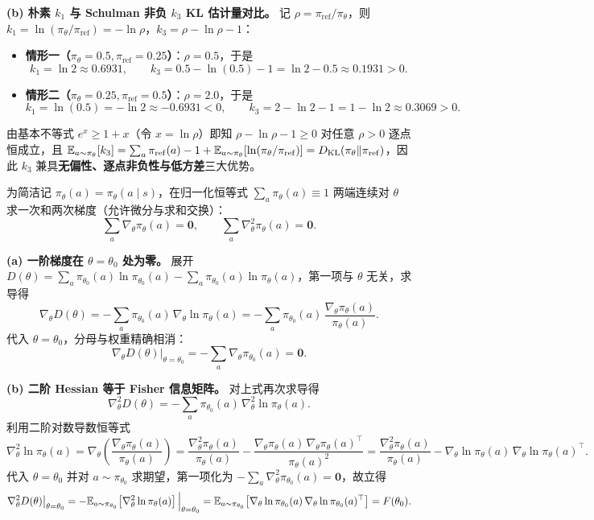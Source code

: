 \textbf{(b) 朴素 $k_1$ 与 Schulman 非负 $k_3$ KL 估计量对比。} 记 $\rho = \pi_{\mathrm{ref}} / \pi_\theta$，则 $k_1 = \ln(\pi_\theta / \pi_{\mathrm{ref}}) = -\ln \rho$，$k_3 = \rho - \ln \rho - 1$：
\begin{itemize}
  \item \textbf{情形一（$\pi_\theta = 0.5, \pi_{\mathrm{ref}} = 0.25$）}：$\rho = 0.5$，于是
  \[
    k_1 = \ln 2 \approx \mathbf{0.6931}, \qquad
    k_3 = 0.5 - \ln(0.5) - 1 = \ln 2 - 0.5 \approx \mathbf{0.1931} > 0.
  \]
  \item \textbf{情形二（$\pi_\theta = 0.25, \pi_{\mathrm{ref}} = 0.5$）}：$\rho = 2.0$，于是
  \[
    k_1 = \ln(0.5) = -\ln 2 \approx \mathbf{-0.6931} < 0, \qquad
    k_3 = 2 - \ln 2 - 1 = 1 - \ln 2 \approx \mathbf{0.3069} > 0.
  \]
\end{itemize}
由基本不等式 $e^x \ge 1 + x$（令 $x = \ln \rho$）即知 $\rho - \ln \rho - 1 \ge 0$ 对任意 $\rho > 0$ 逐点恒成立，且 $\mathbb{E}_{a \sim \pi_\theta}[k_3] = \sum_a \pi_{\mathrm{ref}}(a) - 1 + \mathbb{E}_{a \sim \pi_\theta}[\ln(\pi_\theta / \pi_{\mathrm{ref}})] = D_{\mathrm{KL}}(\pi_\theta \| \pi_{\mathrm{ref}})$，因此 $k_3$ 兼具\textbf{无偏性、逐点非负性与低方差}三大优势。


为简洁记 $\pi_\theta(a) = \pi_\theta(a \mid s)$，在归一化恒等式 $\sum_a \pi_\theta(a) \equiv 1$ 两端连续对 $\theta$ 求一次和两次梯度（允许微分与求和交换）：
\begin{equation*}
  \sum_a \nabla_\theta \pi_\theta(a) = \mathbf{0}, \qquad
  \sum_a \nabla_\theta^2 \pi_\theta(a) = \mathbf{0}.
\end{equation*}

\textbf{(a) 一阶梯度在 $\theta = \theta_0$ 处为零。} 展开 $D(\theta) = \sum_a \pi_{\theta_0}(a) \ln \pi_{\theta_0}(a) - \sum_a \pi_{\theta_0}(a) \ln \pi_\theta(a)$，第一项与 $\theta$ 无关，求导得
\[
  \nabla_\theta D(\theta) = -\sum_a \pi_{\theta_0}(a)\,\nabla_\theta \ln \pi_\theta(a) = -\sum_a \pi_{\theta_0}(a)\,\frac{\nabla_\theta \pi_\theta(a)}{\pi_\theta(a)}.
\]
代入 $\theta = \theta_0$，分母与权重精确相消：
\[
  \nabla_\theta D(\theta)\big|_{\theta=\theta_0} = -\sum_a \nabla_\theta \pi_{\theta_0}(a) = \mathbf{0}.
\]

\textbf{(b) 二阶 Hessian 等于 Fisher 信息矩阵。} 对上式再次求导得
\[
  \nabla_\theta^2 D(\theta) = -\sum_a \pi_{\theta_0}(a)\,\nabla_\theta^2 \ln \pi_\theta(a).
\]
利用二阶对数导数恒等式
\[
  \nabla_\theta^2 \ln \pi_\theta(a)
  = \nabla_\theta\!\left(\frac{\nabla_\theta \pi_\theta(a)}{\pi_\theta(a)}\right)
  = \frac{\nabla_\theta^2 \pi_\theta(a)}{\pi_\theta(a)} - \frac{\nabla_\theta \pi_\theta(a)\,\nabla_\theta \pi_\theta(a)^\top}{\pi_\theta(a)^2}
  = \frac{\nabla_\theta^2 \pi_\theta(a)}{\pi_\theta(a)} - \nabla_\theta \ln \pi_\theta(a)\,\nabla_\theta \ln \pi_\theta(a)^\top.
\]
代入 $\theta = \theta_0$ 并对 $a \sim \pi_{\theta_0}$ 求期望，第一项化为 $-\sum_a \nabla_\theta^2 \pi_{\theta_0}(a) = \mathbf{0}$，故立得
\[
  \nabla_\theta^2 D(\theta)\big|_{\theta=\theta_0}
  = -\mathbb{E}_{a \sim \pi_{\theta_0}}\!\left[\nabla_\theta^2 \ln \pi_\theta(a)\right]\Big|_{\theta=\theta_0}
  = \mathbb{E}_{a \sim \pi_{\theta_0}}\!\left[\nabla_\theta \ln \pi_{\theta_0}(a)\,\nabla_\theta \ln \pi_{\theta_0}(a)^\top\right] = F(\theta_0).
\]

